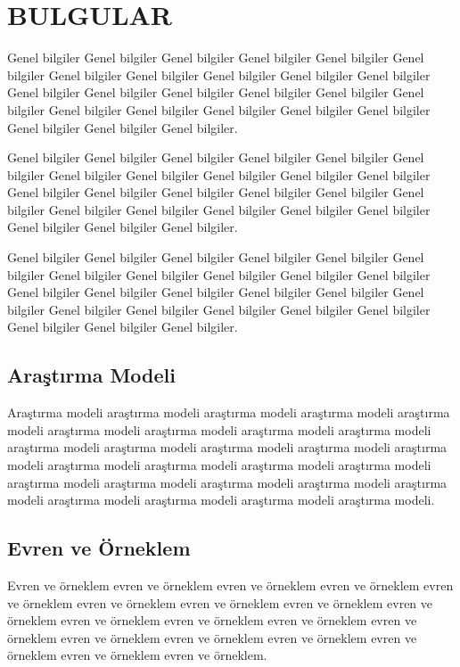 \chapter{BULGULAR}

Genel bilgiler Genel bilgiler Genel bilgiler Genel bilgiler Genel bilgiler Genel bilgiler Genel bilgiler Genel bilgiler Genel bilgiler Genel bilgiler Genel bilgiler Genel bilgiler Genel bilgiler Genel bilgiler Genel bilgiler Genel bilgiler Genel bilgiler Genel bilgiler Genel bilgiler Genel bilgiler Genel bilgiler Genel bilgiler Genel bilgiler Genel bilgiler Genel bilgiler.

Genel bilgiler Genel bilgiler Genel bilgiler Genel bilgiler Genel bilgiler Genel bilgiler Genel bilgiler Genel bilgiler Genel bilgiler Genel bilgiler Genel bilgiler Genel bilgiler Genel bilgiler Genel bilgiler Genel bilgiler Genel bilgiler Genel bilgiler Genel bilgiler Genel bilgiler Genel bilgiler Genel bilgiler Genel bilgiler Genel bilgiler Genel bilgiler Genel bilgiler.

Genel bilgiler Genel bilgiler Genel bilgiler Genel bilgiler Genel bilgiler Genel bilgiler Genel bilgiler Genel bilgiler Genel bilgiler Genel bilgiler Genel bilgiler Genel bilgiler Genel bilgiler Genel bilgiler Genel bilgiler Genel bilgiler Genel bilgiler Genel bilgiler Genel bilgiler Genel bilgiler Genel bilgiler Genel bilgiler Genel bilgiler Genel bilgiler Genel bilgiler.

\section{Araştırma Modeli}

Araştırma modeli araştırma modeli araştırma modeli araştırma modeli araştırma modeli araştırma modeli araştırma modeli araştırma modeli araştırma modeli araştırma modeli araştırma modeli araştırma modeli araştırma modeli araştırma modeli araştırma modeli araştırma modeli araştırma modeli araştırma modeli araştırma modeli araştırma modeli araştırma modeli araştırma modeli araştırma modeli araştırma modeli araştırma modeli araştırma modeli araştırma modeli.

\section{Evren ve Örneklem}

Evren ve örneklem evren ve örneklem evren ve örneklem evren ve örneklem evren ve örneklem evren ve örneklem evren ve örneklem evren ve örneklem evren ve örneklem evren ve örneklem evren ve örneklem evren ve örneklem evren ve örneklem evren ve örneklem evren ve örneklem evren ve örneklem evren ve örneklem evren ve örneklem evren ve örneklem.

